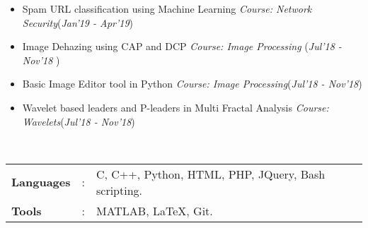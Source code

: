 \documentclass[10pt]{article}
\newcommand\hs{1.3mm}        %
\begin{document}
\begin{itemize}[leftmargin=0.4cm]

    \item Spam URL classification using Machine Learning \textpipe \hspace{0.2cm} \textit{Course: Network Security}\hspace{2.7cm}(\textit{Jan'19 - Apr'19})

     \item Image Dehazing using CAP and DCP \textpipe \hspace{-0.1cm} \textit{Course: Image Processing} \hfill{(\textit{Jul’18 - Nov’18 })}

    \item Basic Image Editor tool in Python
  \textpipe \hspace{0.2cm} \textit{Course: Image Processing}\hspace{5.1cm}(\textit{Jul'18 - Nov'18})
    \item Wavelet based leaders and P-leaders in Multi Fractal Analysis \textpipe \hspace{0.2cm}  \textit{Course: Wavelets}\hspace{1.95cm}(\textit{Jul'18 - Nov'18})

\end{itemize}



\colorbox{bl}{}\\
\begin{tabular}{m{1in}m{0.20in}m{4.5in}}
    \hspace{\hs} \textbf{\textbf{Languages}} &: & {{C, C++, Python, HTML, PHP, JQuery, Bash scripting.}} \\
    \hspace{\hs} \textbf{\textbf{Tools}} &: & {MATLAB, \LaTeX, Git.}\\
\end{tabular}

\colorbox{bl}{}
\end{document}
